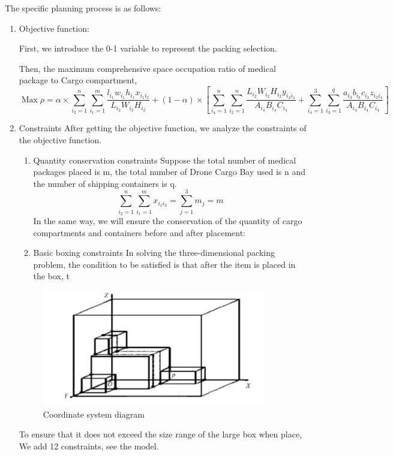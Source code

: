 \documentclass[a4paper,12pt]{article}
\begin{document}
	The specific planning process is as follows:
	\begin{enumerate}
		\item Objective function:
		
		First, we introduce the 0-1 variable to represent the packing selection.
		
		Then, the maximum comprehensive space occupation ratio of medical package to Cargo
		compartment,
	\begin{equation}
	\operatorname{Max} \rho=\alpha \times \sum_{i_{2}=1}^{n} \sum_{i_{1}=1}^{m} \frac{l_{i_{1}} w_{i_{1}} h_{i_{1}} x_{i_{1} i_{2}}}{L_{i_{2}} W_{i_{2}} H_{i_{2}}}+(1-\alpha) \times\left[\sum_{i_{4}=1}^{n} \sum_{i_{2}=1}^{n} \frac{L_{i_{2}} W_{i_{2}} H_{i_{2}} y_{i_{2} i_{4}}}{A_{i_{4}} B_{i_{4}} C_{i_{4}}}+\sum_{i_{4}=1}^{3} \sum_{i_{3}=1}^{q} \frac{a_{i_{3}} b_{i_{3}} c_{i_{3}} z_{i_{3} i_{4}}}{A_{i_{4}} B_{i_{4}} C_{i_{4}}}\right]
	\end{equation}
		\item Constraints
		After getting the objective function, we analyze the constraints of the objective function.
	\begin{enumerate}
		\item Quantity conservation constraints
		Suppose the total number of medical packages placed is m, the total number of Drone
		Cargo Bay used is n and the number of shipping containers is q.
	\begin{equation}
	\sum_{i_{2}=1}^{n} \sum_{i_{1}=1}^{m} x_{i_{1} i_{2}}=\sum_{j=1}^{3} m_{j}=m
	\end{equation}
	In the same way, we will ensure the conservation of the quantity of cargo compartments
	and containers before and after placement:
		\item Basic boxing constraints
		In solving the three-dimensional packing problem, the condition to be satisfied is that after
		the item is placed in the box, t
	\end{enumerate}
	\begin{figure}
		\centering
		\includegraphics[width=0.5\linewidth]{1}
		\caption{Coordinate system diagram}
		\label{fig:1}
	\end{figure}
	To ensure that it does not exceed the size range of the large box when place, We add 12
	constraints, see the model.
	\end{enumerate}
\end{document}
